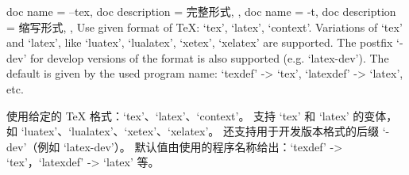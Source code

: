 \begin{docKeys}[
  doc no index,   %
  doc parameter = {~\meta{format}},
]
{
  {
    doc name        = --tex,
    doc description = 完整形式,
  },
  {
    doc name        = -t,
    doc description = 缩写形式,
  },
}
Use given format of TeX: `tex', `latex', `context'.
Variations of `tex' and `latex', like `luatex', `lualatex', `xetex', `xelatex' are supported.
The postfix `-dev' for develop versions of the format is also supported (e.g. `latex-dev').
The default is given by the used program name: `texdef' -> `tex', `latexdef' -> `latex', etc.

%
使用给定的 TeX 格式：`tex’、`latex'、`context'。 支持 `tex' 和 `latex' 的变体，如 `luatex'、`lualatex'、`xetex'、`xelatex'。 还支持用于开发版本格式的后缀 `-dev'（例如 `latex-dev'）。 默认值由使用的程序名称给出：`texdef' -> `tex'，`latexdef' -> `latex' 等。
\end{docKeys}